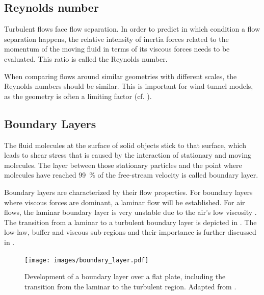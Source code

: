 \subsection{Reynolds number}
\label{sec:reynolds_number}


Turbulent flows face flow separation. 
In order to predict in which condition a flow separation happens, the relative intensity of inertia forces related to the momentum of the moving fluid in terms of its viscous forces needs to be evaluated. This ratio is called the Reynolds number.


When comparing flows around similar geometries with different scales, the Reynolds numbers should be similar. This is important for wind tunnel models, as the geometry is often a limiting factor (cf. ). 

\subsection{Boundary Layers}
\label{sec:theory:boundary-layer}

The fluid molecules at the surface of solid objects stick to that surface, which leads to shear stress that is caused by the interaction of stationary and moving molecules. The layer between those stationary particles and the point where molecules have reached \SI{99}{\percent} of the free-stream velocity is called boundary layer.

Boundary layers are characterized by their flow properties. For boundary layers where viscous forces are dominant, a laminar flow will be established. For air flows, the laminar boundary layer is very unstable due to the air's low viscosity \cite{Aynsley1999}. The transition from a laminar to a turbulent boundary layer is depicted in . The low-law, buffer and viscous sub-regions and their importance is further discussed in  .


\begin{figure}[bht]
	\centering
	\texttt{[image: images/boundary\_layer.pdf]}
	\captionsetup{format=plain}
	\caption[Development of a boundary layer over a flat plate]{Development of a boundary layer over a flat plate, including the transition from the laminar to the turbulent region. Adapted from \citep{Cengal2006}.}
	\label{fig:boundarylayer}
\end{figure}









